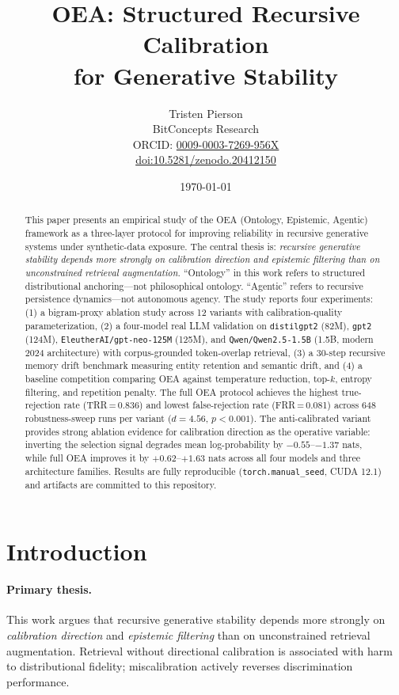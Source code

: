 \documentclass[11pt]{article}
\title{OEA: Structured Recursive Calibration\\for Generative Stability}
\author{Tristen Pierson\\
  BitConcepts Research\\
  \small ORCID: \href{https://orcid.org/0009-0003-7269-956X}{0009-0003-7269-956X}\\
  \small \href{https://doi.org/10.5281/zenodo.20412150}{doi:10.5281/zenodo.20412150}}
\date{\today}
\begin{document}
\maketitle

\begin{abstract}
This paper presents an empirical study of the OEA (Ontology, Epistemic, Agentic) framework as a three-layer protocol for improving reliability in recursive generative systems under synthetic-data exposure.
The central thesis is: \emph{recursive generative stability depends more strongly on calibration direction and epistemic filtering than on unconstrained retrieval augmentation.}
``Ontology'' in this work refers to structured distributional anchoring---not philosophical ontology.
``Agentic'' refers to recursive persistence dynamics---not autonomous agency.
The study reports four experiments: (1) a bigram-proxy ablation study across 12 variants with calibration-quality parameterization, (2) a four-model real LLM validation on \texttt{distilgpt2} (82M), \texttt{gpt2} (124M), \texttt{EleutherAI/gpt-neo-125M} (125M), and \texttt{Qwen/Qwen2.5-1.5B} (1.5B, modern 2024 architecture) with corpus-grounded token-overlap retrieval, (3) a 30-step recursive memory drift benchmark measuring entity retention and semantic drift, and (4) a baseline competition comparing OEA against temperature reduction, top-$k$, entropy filtering, and repetition penalty.
The full OEA protocol achieves the highest true-rejection rate (TRR\,=\,0.836) and lowest false-rejection rate (FRR\,=\,0.081) across 648 robustness-sweep runs per variant ($d=4.56$, $p<0.001$).
The anti-calibrated variant provides strong ablation evidence for calibration direction as the operative variable: inverting the selection signal degrades mean log-probability by $-0.55$--$-1.37$ nats, while full OEA improves it by $+0.62$--$+1.63$ nats across all four models and three architecture families.
Results are fully reproducible (\texttt{torch.manual\_seed}, CUDA 12.1) and artifacts are committed to this repository.
\end{abstract}

\section{Introduction}
\label{sec:intro}

\paragraph{Primary thesis.}
This work argues that recursive generative stability depends more strongly on \emph{calibration direction} and \emph{epistemic filtering} than on unconstrained retrieval augmentation. Retrieval without directional calibration is associated with harm to distributional fidelity; miscalibration actively reverses discrimination performance.
\end{document}

